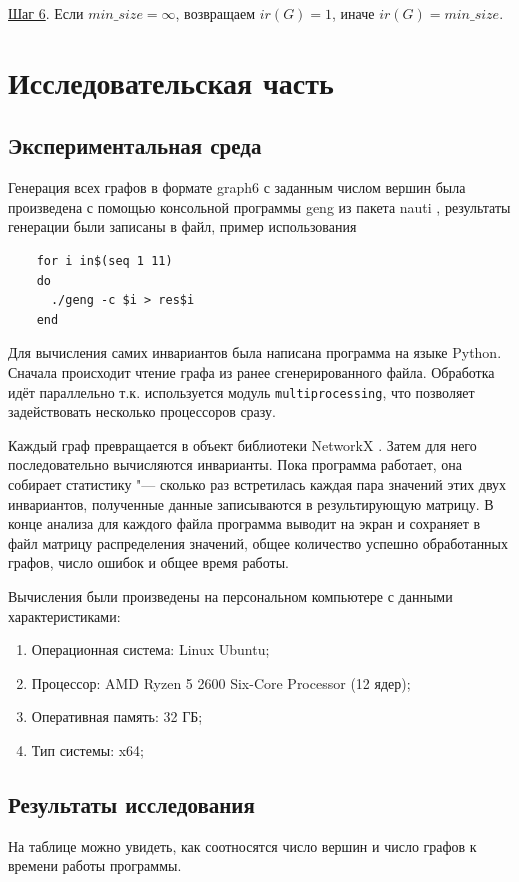 \documentclass[bachelor, och, nir]{SCWorks}
\begin{document}
\underline{Шаг 6}. Если $min\_size = \infty$, возвращаем $ir(G) = 1$, иначе  $ir(G) = min\_size$.




\newpage
\section{Исследовательская часть}

\subsection{Экспериментальная среда}
Генерация всех графов в формате graph6  \cite{graph6} с заданным числом вершин была произведена с помощью консольной программы geng из пакета nauti \cite{nauty}, результаты генерации были записаны в файл, пример использования 
    \begin{verbatim}
    for i in$(seq 1 11)
    do 
      ./geng -c $i > res$i
    end
    \end{verbatim}


Для вычисления самих инвариантов была написана программа на языке Python.
Сначала происходит чтение графа из ранее сгенерированного файла. Обработка идёт параллельно т.к. используется модуль \texttt{multiprocessing}, что позволяет задействовать несколько процессоров сразу.

Каждый граф превращается в объект библиотеки NetworkX  \cite{networkx}. Затем для него последовательно вычисляются инварианты. Пока программа работает, она собирает статистику "--- сколько раз встретилась каждая пара значений этих двух инвариантов, полученные данные записываются в результирующую матрицу. В конце анализа для каждого файла программа выводит на экран и сохраняет в файл матрицу распределения значений, общее количество успешно обработанных графов, число ошибок и общее время работы.

Вычисления были произведены на персональном компьютере с данными характеристиками:
\begin{enumerate}
    \item Операционная система: Linux Ubuntu;
    \item Процессор: AMD Ryzen 5 2600 Six-Core Processor (12 ядер);
    \item Оперативная память: 32 ГБ;
    \item Тип системы: x64;
\end{enumerate}

\subsection{Результаты исследования}
На таблице можно увидеть, как соотносятся число вершин и число графов к времени работы программы.  
\end{document}
